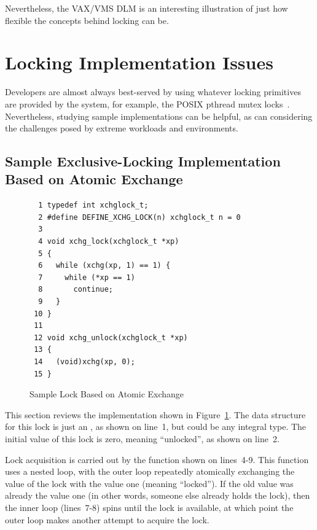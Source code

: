 Nevertheless, the VAX/VMS DLM is an interesting illustration of just
how flexible the concepts behind locking can be.

\section{Locking Implementation Issues}
\label{sec:locking:Locking Implementation Issues}

Developers are almost always best-served by using whatever locking
primitives are provided by the system, for example, the POSIX
pthread mutex locks~\cite{OpenGroup1997pthreads,Butenhof1997pthreads}.
Nevertheless, studying sample implementations can be helpful,
as can considering the challenges posed by extreme workloads and
environments.

\subsection{Sample Exclusive-Locking Implementation Based on Atomic Exchange}
\label{sec:locking:Sample Exclusive-Locking Implementation Based on Atomic Exchange}

\begin{figure}[tbp]
{ \scriptsize
\begin{verbatim}
  1 typedef int xchglock_t;
  2 #define DEFINE_XCHG_LOCK(n) xchglock_t n = 0
  3 
  4 void xchg_lock(xchglock_t *xp)
  5 {
  6   while (xchg(xp, 1) == 1) {
  7     while (*xp == 1)
  8       continue;
  9   }
 10 }
 11 
 12 void xchg_unlock(xchglock_t *xp)
 13 {
 14   (void)xchg(xp, 0);
 15 }
\end{verbatim}
}
\caption{Sample Lock Based on Atomic Exchange}
\label{fig:locking:Sample Lock Based on Atomic Exchange}
\end{figure}

This section reviews the implementation shown in
Figure~\ref{fig:locking:Sample Lock Based on Atomic Exchange}.
The data structure for this lock is just an , as shown on
line~1, but could be any integral type.
The initial value of this lock is zero, meaning ``unlocked'',
as shown on line~2.

Lock acquisition is carried out by the  function
shown on lines~4-9.
This function uses a nested loop, with the outer loop repeatedly
atomically exchanging the value of the lock with the value one
(meaning ``locked'').
If the old value was already the value one (in other words, someone
else already holds the lock), then the inner loop (lines~7-8)
spins until the lock is available, at which point the outer loop
makes another attempt to acquire the lock.

